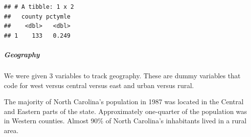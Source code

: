 \documentclass[]{article}
\newenvironment{Shaded}{\begin{snugshade}}{\end{snugshade}}
\newcommand{\CommentTok}[1]{\textcolor[rgb]{0.56,0.35,0.01}{\textit{#1}}}
\newcommand{\DataTypeTok}[1]{\textcolor[rgb]{0.13,0.29,0.53}{#1}}
\newcommand{\DecValTok}[1]{\textcolor[rgb]{0.00,0.00,0.81}{#1}}
\newcommand{\KeywordTok}[1]{\textcolor[rgb]{0.13,0.29,0.53}{\textbf{#1}}}
\newcommand{\NormalTok}[1]{#1}
\newcommand{\OperatorTok}[1]{\textcolor[rgb]{0.81,0.36,0.00}{\textbf{#1}}}
\newcommand{\StringTok}[1]{\textcolor[rgb]{0.31,0.60,0.02}{#1}}
\let\oldsubparagraph\subparagraph
\renewcommand{\subparagraph}[1]{\oldsubparagraph{#1}\mbox{}}
\begin{document}
\begin{Shaded}
\end{Shaded}

\begin{verbatim}
## # A tibble: 1 x 2
##   county pctymle
##    <dbl>   <dbl>
## 1    133   0.249
\end{verbatim}

\hypertarget{geography-1}{%
\subparagraph{Geography}\label{geography-1}}

We were given 3 variables to track geography. These are dummy variables
that code for west versus central versus east and urban versus rural.

The majority of North Carolina's population in 1987 was located in the
Central and Eastern parts of the state. Approximately one-quarter of the
population was in Western counties. Almost 90\% of North Carolina's
inhabitants lived in a rural area.

\begin{Shaded}
\end{Shaded}
\end{document}
